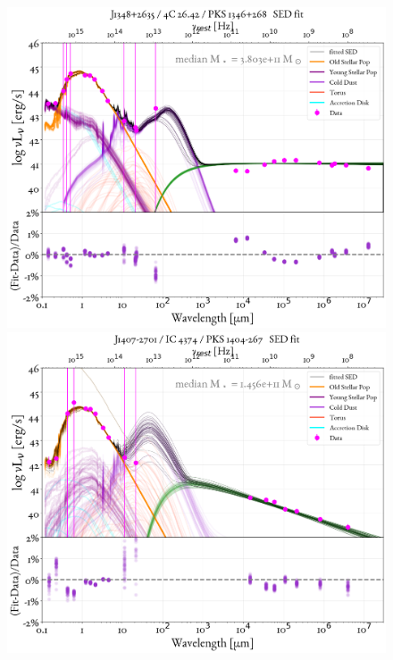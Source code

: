 \begin{figure}
    \centering
    \includegraphics[width=0.85\linewidth]{figures/ResultFits/56_SEDfit_4326.png}\\
    \includegraphics[width=0.85\linewidth]{figures/ResultFits/60_SEDfit_4364.png}   
\end{figure}
